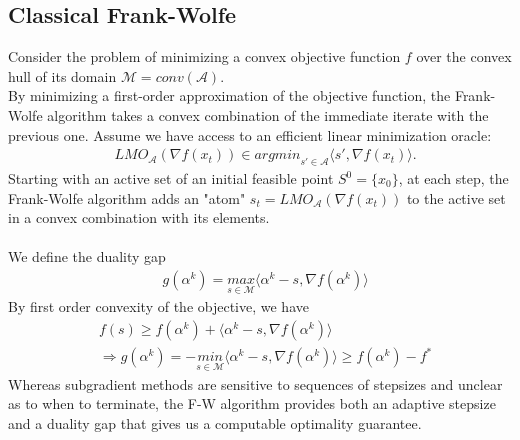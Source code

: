\documentclass{article}
\begin{document}
\subsection{Classical Frank-Wolfe}
Consider the problem of minimizing a convex objective function $f$ over the convex hull of its domain $\mathcal{M}= conv(\mathcal{A})$.\\
By minimizing a first-order approximation of the objective function, the Frank-Wolfe algorithm \cite{phillip} takes a convex combination of the immediate iterate with the previous one. Assume we have access to an efficient linear minimization oracle:
\begin{equation*}
\begin{aligned}
    &LMO_{\mathcal{A}}(\nabla f(x_{t}))\in \textit{argmin}_{s\prime\in\mathcal{A}}\langle s\prime, \nabla f(x_{t})\rangle.
\end{aligned}    
\end{equation*}
Starting with an active set of an initial feasible point $S^{0}= \{x_{0}\}$, at each step, the Frank-Wolfe algorithm adds an "atom" $s_{t}= LMO_{\mathcal{A}}(\nabla f(x_{t}))$ to the active set in a convex combination with its elements.\\
\\
We define the duality gap \cite{Jaggi13}
\begin{equation*}
\begin{aligned}
    &g(\alpha^{k})= \underset{s\in\mathcal{M}}{\textit{max}}\langle \alpha^{k}-s, \nabla f(\alpha^{k})\rangle
\end{aligned}
\end{equation*}
By first order convexity of the objective, we have
\begin{equation*}
\begin{aligned}
    &f(s)\geq f(\alpha^{k})+ \langle \alpha^{k}-s, \nabla f(\alpha^{k})\rangle\\
    &\Longrightarrow g(\alpha^{k})= -\underset{s\in\mathcal{M}}{\textit{min}}\langle \alpha^{k}-s, \nabla f(\alpha^{k})\rangle \geq f(\alpha^{k})- f^{*}
\end{aligned}
\end{equation*}
Whereas subgradient methods are sensitive to sequences of stepsizes and unclear as to when to terminate, the F-W algorithm provides both an adaptive stepsize and a duality gap that gives us a computable optimality guarantee.
\end{document}
